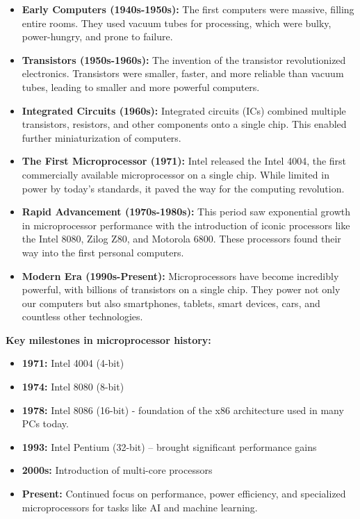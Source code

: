 \documentclass[
]{article}
\begin{document}
\begin{itemize}
\item
  \textbf{Early Computers (1940s-1950s):} The first computers were
  massive, filling entire rooms. They used vacuum tubes for processing,
  which were bulky, power-hungry, and prone to failure.
\item
  \textbf{Transistors (1950s-1960s):} The invention of the transistor
  revolutionized electronics. Transistors were smaller, faster, and more
  reliable than vacuum tubes, leading to smaller and more powerful
  computers.
\item
  \textbf{Integrated Circuits (1960s):} Integrated circuits (ICs)
  combined multiple transistors, resistors, and other components onto a
  single chip. This enabled further miniaturization of computers.
\item
  \textbf{The First Microprocessor (1971):} Intel released the Intel
  4004, the first commercially available microprocessor on a single
  chip. While limited in power by today's standards, it paved the way
  for the computing revolution.
\item
  \textbf{Rapid Advancement (1970s-1980s):} This period saw exponential
  growth in microprocessor performance with the introduction of iconic
  processors like the Intel 8080, Zilog Z80, and Motorola 6800. These
  processors found their way into the first personal computers.
\item
  \textbf{Modern Era (1990s-Present):} Microprocessors have become
  incredibly powerful, with billions of transistors on a single chip.
  They power not only our computers but also smartphones, tablets, smart
  devices, cars, and countless other technologies.
\end{itemize}

\textbf{Key milestones in microprocessor history:}

\begin{itemize}
\item
  \textbf{1971:} Intel 4004 (4-bit)
\item
  \textbf{1974:} Intel 8080 (8-bit)
\item
  \textbf{1978:} Intel 8086 (16-bit) - foundation of the x86
  architecture used in many PCs today.
\item
  \textbf{1993:} Intel Pentium (32-bit) -- brought significant
  performance gains
\item
  \textbf{2000s:} Introduction of multi-core processors
\item
  \textbf{Present:} Continued focus on performance, power efficiency,
  and specialized microprocessors for tasks like AI and machine
  learning.
\end{itemize}
\end{document}
